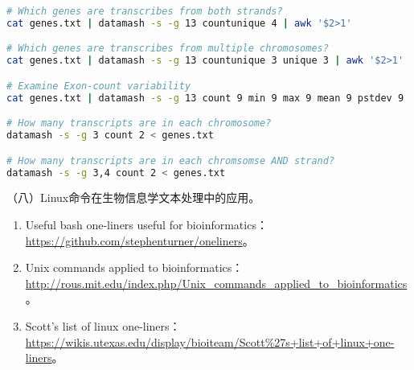 \begin{enumerate}
\begin{enumerate}
\begin{lstlisting}[language=bash]
# Which genes are transcribes from both strands? 
cat genes.txt | datamash -s -g 13 countunique 4 | awk '$2>1'

# Which genes are transcribes from multiple chromosomes? 
cat genes.txt | datamash -s -g 13 countunique 3 unique 3 | awk '$2>1'

# Examine Exon-count variability
cat genes.txt | datamash -s -g 13 count 9 min 9 max 9 mean 9 pstdev 9 | awk '$2>1'

# How many transcripts are in each chromosome?
datamash -s -g 3 count 2 < genes.txt

# How many transcripts are in each chromsomse AND strand?
datamash -s -g 3,4 count 2 < genes.txt
\end{lstlisting}
    \end{enumerate}
\end{enumerate}

\vspace{0.1in}
（八）Linux命令在生物信息学文本处理中的应用。
\begin{enumerate}
  \item Useful bash one-liners useful for bioinformatics：\\ \href{https://github.com/stephenturner/oneliners}{https://github.com/stephenturner/oneliners}。
  \item Unix commands applied to bioinformatics：\\ \href{http://rous.mit.edu/index.php/Unix\_commands\_applied\_to\_bioinformatics}{http://rous.mit.edu/index.php/Unix\_commands\_applied\_to\_bioinformatics}。
  \item Scott's list of linux one-liners：\\ \href{https://wikis.utexas.edu/display/bioiteam/Scott\%27s+list+of+linux+one-liners}{https://wikis.utexas.edu/display/bioiteam/Scott\%27s+list+of+linux+one-liners}。
\end{enumerate}

